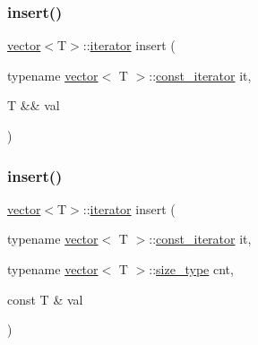 \mbox{\label{classvector_a6ab64206e07e4e80710300aced53d444}} 
\subsubsection{\texorpdfstring{insert()}{insert()}\hspace{0.1cm}{\footnotesize\ttfamily [7/10]}}
{\footnotesize\ttfamily \mbox{\hyperlink{classvector}{vector}}$<$T$>$\+::\mbox{\hyperlink{classvector_a35c955cacac6aacaa1e82874b1628865}{iterator}} insert (\begin{DoxyParamCaption}\item[{typename \mbox{\hyperlink{classvector}{vector}}$<$ T $>$\+::\mbox{\hyperlink{classvector_a2fc97dce62b7053449cc868607540dba}{const\+\_\+iterator}}}]{it,  }\item[{T \&\&}]{val }\end{DoxyParamCaption})}

\mbox{\label{classvector_aa0148422cb4a2551778e886a86813c27}} 
\subsubsection{\texorpdfstring{insert()}{insert()}\hspace{0.1cm}{\footnotesize\ttfamily [8/10]}}
{\footnotesize\ttfamily \mbox{\hyperlink{classvector}{vector}}$<$T$>$\+::\mbox{\hyperlink{classvector_a35c955cacac6aacaa1e82874b1628865}{iterator}} insert (\begin{DoxyParamCaption}\item[{typename \mbox{\hyperlink{classvector}{vector}}$<$ T $>$\+::\mbox{\hyperlink{classvector_a2fc97dce62b7053449cc868607540dba}{const\+\_\+iterator}}}]{it,  }\item[{typename \mbox{\hyperlink{classvector}{vector}}$<$ T $>$\+::\mbox{\hyperlink{classvector_ada51e68d31936547d3729c82daf6b7c6}{size\+\_\+type}}}]{cnt,  }\item[{const T \&}]{val }\end{DoxyParamCaption})}

\mbox{\label{classvector_a5abe2c95bfad8ac5297294f0024a4c11}} 
